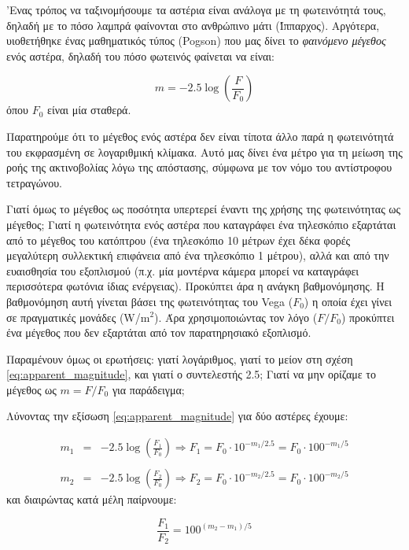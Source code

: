 'Ενας τρόπος να ταξινομήσουμε τα αστέρια είναι ανάλογα με τη φωτεινότητά τους, δηλαδή με το πόσο λαμπρά φαίνονται στο ανθρώπινο μάτι (Ίππαρχος). Αργότερα, υιοθετήθηκε ένας μαθηματικός τύπος (Pogson) που μας δίνει το \textit{φαινόμενο μέγεθος} ενός αστέρα, δηλαδή του πόσο φωτεινός φαίνεται να είναι:

\begin{equation}
    \label{eq:apparent_magnitude}
    m = -2.5 \log \left ( \frac{F}{F_0} \right )
\end{equation}
όπου $F_0$ είναι μία σταθερά.

Παρατηρούμε ότι το μέγεθος ενός αστέρα δεν είναι τίποτα άλλο παρά η φωτεινότητά του εκφρασμένη σε λογαριθμική κλίμακα. Αυτό μας δίνει ένα μέτρο για τη μείωση της ροής της ακτινοβολίας λόγω της απόστασης, σύμφωνα με τον νόμο του αντίστροφου τετραγώνου.

Γιατί όμως το μέγεθος ως ποσότητα υπερτερεί έναντι της χρήσης της φωτεινότητας ως μέγεθος; Γιατί η φωτεινότητα ενός αστέρα που καταγράφει ένα τηλεσκόπιο εξαρτάται από το μέγεθος του κατόπτρου (ένα τηλεσκόπιο 10 μέτρων έχει δέκα φορές μεγαλύτερη συλλεκτική επιφάνεια από ένα τηλεσκόπιο 1 μέτρου), αλλά και από την ευαισθησία του εξοπλισμού (π.χ. μία μοντέρνα κάμερα μπορεί να καταγράφει περισσότερα φωτόνια ίδιας ενέργειας). {\color{blue} Προκύπτει άρα η ανάγκη βαθμονόμησης}. Η βαθμονόμηση αυτή γίνεται βάσει της φωτεινότητας του Vega ($F_0$) η οποία έχει γίνει σε πραγματικές μονάδες (W/$\text{m}^2$). Άρα χρησιμοποιώντας τον λόγο ($F/F_0$) προκύπτει ένα μέγεθος που δεν εξαρτάται από τον παρατηρησιακό εξοπλισμό.

Παραμένουν όμως οι ερωτήσεις: γιατί λογάριθμος, γιατί το μείον στη σχέση \eqref{eq:apparent_magnitude}, και γιατί ο συντελεστής 2.5; Γιατί να μην ορίζαμε το μέγεθος ως $m = F/F_0$ για παράδειγμα;

Λύνοντας την εξίσωση \eqref{eq:apparent_magnitude} για δύο αστέρες έχουμε:

\begin{eqnarray*}
    m_1 &=& -2.5 \log \left( \frac{F_1}{F_0} \right) \Rightarrow F_1 = F_0 \cdot 10^{-m_1/2.5} = F_0 \cdot 100^{-m_1/5} \\\\
    m_2 &=& -2.5 \log \left( \frac{F_2}{F_0} \right) \Rightarrow F_2 = F_0 \cdot 10^{-m_2/2.5} = F_0 \cdot 100^{-m_2/5}
\end{eqnarray*}
και διαιρώντας κατά μέλη παίρνουμε:

\begin{equation}
    \frac{F_1}{F_2} = 100^{(m_2 - m_1)/5}
\end{equation}

